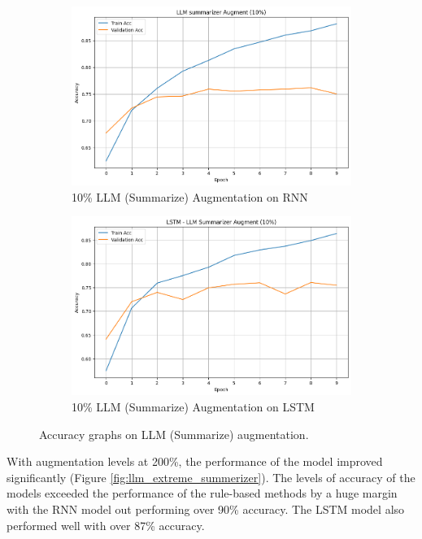 \documentclass{article}
\begin{document}
\begin{figure}[ht]
  \centering
  \begin{subfigure}[b]{0.45\textwidth}
    \includegraphics[width=\textwidth]{img/llm_summarise_10_rnn.png}
    \caption{10\% LLM (Summarize) Augmentation on RNN}
    \label{fig:llm_summarise_10_rnn}
  \end{subfigure}
  \hfill
  \begin{subfigure}[b]{0.45\textwidth}
    \includegraphics[width=\textwidth]{img/llm_summarise_10_lstm.png}
    \caption{10\% LLM (Summarize) Augmentation on LSTM}
    \label{fig:llm_summarise_10_lstm}
  \end{subfigure}
  \caption{Accuracy graphs on LLM (Summarize) augmentation.}
  \label{fig:llm_summerizer}
\end{figure}

With augmentation levels at 200\%, the performance of the model improved
significantly (Figure \ref{fig:llm_extreme_summerizer}). The levels of accuracy
of the models exceeded the performance of the rule-based methods by a huge
margin with the RNN model out performing over 90\% accuracy. The LSTM model
also performed well with over 87\% accuracy.
\end{document}
